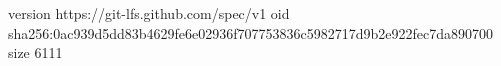 version https://git-lfs.github.com/spec/v1
oid sha256:0ac939d5dd83b4629fe6e02936f707753836c5982717d9b2e922fec7da890700
size 6111
